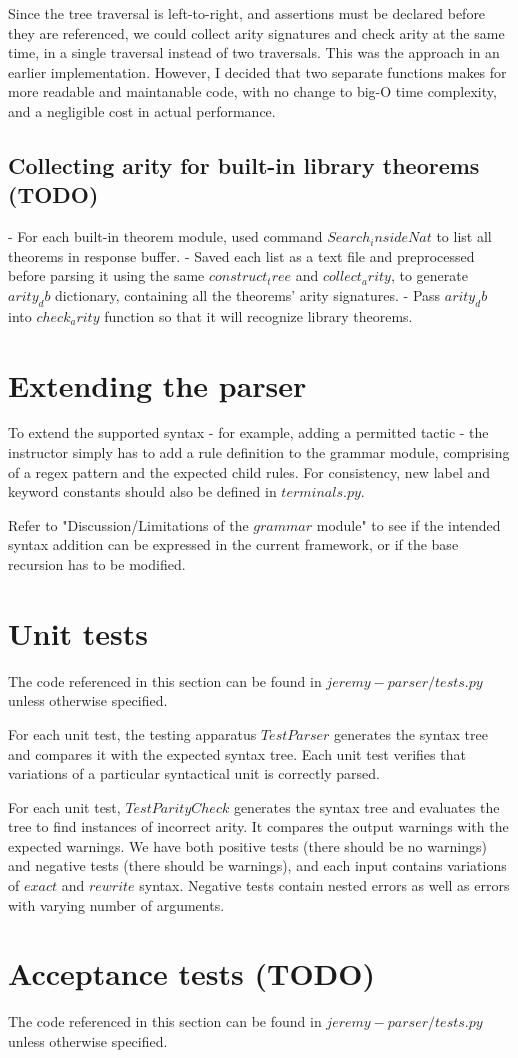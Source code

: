 Since the tree traversal is left-to-right, and assertions must be declared before they are referenced, we could collect arity signatures and check arity at the same time, in a single traversal instead of two traversals. This was the approach in an earlier implementation. However, I decided that two separate functions makes for more readable and maintanable code, with no change to big-O time complexity, and a negligible cost in actual performance.

\subsection{Collecting arity for built-in library theorems (TODO)}

- For each built-in theorem module, used command $Search _ inside Nat$ to list all theorems in response buffer.
- Saved each list as a text file and preprocessed before parsing it using the same $construct_tree$ and $collect_arity$, to generate $arity_db$ dictionary, containing all the theorems' arity signatures.
- Pass $arity_db$ into $check_arity$ function so that it will recognize library theorems.

\section{Extending the parser}
To extend the supported syntax - for example, adding a permitted tactic - the instructor simply has to add a rule definition to the grammar module, comprising of a regex pattern and the expected child rules. For consistency, new label and keyword constants should also be defined in $terminals.py$.

Refer to "Discussion/Limitations of the $grammar$ module" to see if the intended syntax addition can be expressed in the current framework, or if the base recursion has to be modified.

\section{Unit tests}

The code referenced in this section can be found in $jeremy-parser/tests.py$ unless otherwise specified.

For each unit test, the testing apparatus $TestParser$ generates the syntax tree and compares it with the expected syntax tree. Each unit test verifies that variations of a particular syntactical unit is correctly parsed.

For each unit test, $TestParityCheck$ generates the syntax tree and evaluates the tree to find instances of incorrect arity. It compares the output warnings with the expected warnings. We have both positive tests (there should be no warnings) and negative tests (there should be warnings), and each input contains variations of $exact$ and $rewrite$ syntax. Negative tests contain nested errors as well as errors with varying number of arguments.

\section{Acceptance tests  (TODO)}
The code referenced in this section can be found in $jeremy-parser/tests.py$ unless otherwise specified.

